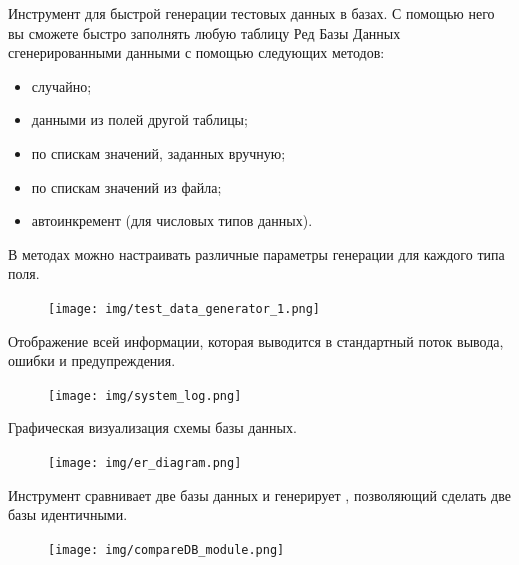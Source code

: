 
Инструмент для быстрой генерации тестовых данных в базах.  С помощью него вы сможете быстро заполнять любую таблицу Ред Базы Данных сгенерированными данными с помощью следующих методов:
\begin{itemize}
	\item случайно;
	\item данными из полей другой таблицы;
	\item по спискам значений, заданных вручную;
	\item по спискам значений из файла;
	\item автоинкремент (для числовых типов данных).
\end{itemize}
В методах можно настраивать различные параметры генерации для каждого типа поля. 

\begin{figure}[H]
	\centering
	\texttt{[image: img/test\_data\_generator\_1.png]}
\end{figure}


Отображение всей информации, которая выводится в стандартный поток вывода, ошибки и предупреждения.
	\begin{figure}[H]
		\centering
		\texttt{[image: img/system\_log.png]}
	\end{figure}


Графическая визуализация схемы базы данных.
	\begin{figure}[H]
		\centering
		\texttt{[image: img/er\_diagram.png]}
	\end{figure}


Инструмент сравнивает две базы данных и генерирует , позволяющий сделать две базы идентичными. 

\begin{figure}[H]
	\centering
	\texttt{[image: img/compareDB\_module.png]}
\end{figure}


